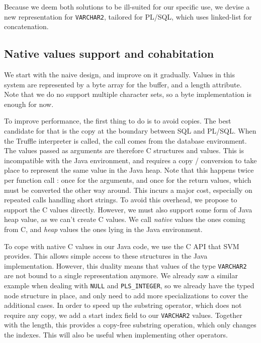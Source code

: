 \documentclass[twoside,11pt,a4paper]{article}
\newcommand{\java}[1]{\textsf{#1}}
\newcommand{\pls}[1]{\small\texttt{#1}\normalsize}
\newcommand{\plstype}[1]{\pls{#1}}
\newcommand{\varchar}{\plstype{VARCHAR2}}
\newcommand{\plsi}{\plstype{PLS\_INTEGER}}
\newcommand{\plsnull}{\pls{NULL}}
\begin{document}
Because we deem both solutions to be ill-suited for our specific use, we devise a new representation for \varchar{}, tailored for PL/SQL, which uses linked-list for concatenation.

\subsection{Native values support and cohabitation}


We start with the naive design, and improve on it gradually. Values in this system are represented by a \java{byte} array for the buffer, and a length attribute. Note that we do no support multiple character sets, so a \java{byte} implementation is enough for now.

To improve performance, the first thing to do  is to avoid copies. The best candidate for that is the copy at the boundary between SQL and PL/SQL. When the Truffle interpreter is called, the call comes from the database environment. The values passed as arguments are therefore C structures and values. This is incompatible with the Java environment, and requires a copy / conversion to take place to represent the same value in the Java heap. Note that this happens twice per function call : once for the arguments, and once for the return values, which must be converted the other way around. This incurs a major cost, especially on repeated calls handling short strings. To avoid this overhead, we propose to support the C values directly. However, we must also support some form of Java heap value, as we can't create C values. We call \textit{native} values the ones coming from C, and \textit{heap} values the ones lying in the Java environment.

To cope with native C values in our Java code, we use the C API that SVM provides. This allows simple access to these structures in the Java implementation. However, this duality means that values of the type \varchar{} are not bound to a single representation anymore. We already saw a similar example when dealing with \plsnull{} and \plsi{}, so we already have the typed node structure in place, and only need to add more specializations to cover the additional cases. In order to speed up the substring operator, which does not require any copy, we add a start index field to our \varchar{} values. Together with the length, this provides a copy-free substring operation, which only changes the indexes. This will also be useful when implementing other operators.
\end{document}
